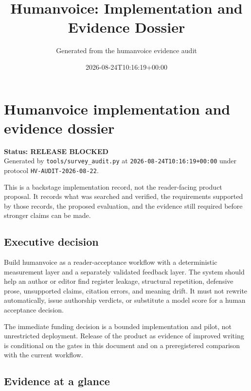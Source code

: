 \documentclass[11pt]{article}
\title{Humanvoice: Implementation and Evidence Dossier}
\author{Generated from the humanvoice evidence audit}
\date{2026-08-24T10:16:19+00:00}
\begin{document}
\hypertarget{humanvoice-implementation-and-evidence-dossier}{%
\section{Humanvoice implementation and evidence dossier}\label{humanvoice-implementation-and-evidence-dossier}}

\textbf{Status: RELEASE BLOCKED}\\
Generated by \texttt{tools/survey\_audit.py} at \texttt{2026-08-24T10:16:19+00:00} under protocol \texttt{HV-AUDIT-2026-08-22}.

This is a backstage implementation record, not the reader-facing product proposal. It records what was searched and verified, the requirements supported by those records, the proposed evaluation, and the evidence still required before stronger claims can be made.

\hypertarget{executive-decision}{%
\subsection{Executive decision}\label{executive-decision}}

Build humanvoice as a reader-acceptance workflow with a deterministic measurement layer and a separately validated feedback layer. The system should help an author or editor find register leakage, structural repetition, defensive prose, unsupported claims, citation errors, and meaning drift. It must not rewrite automatically, issue authorship verdicts, or substitute a model score for a human acceptance decision.

The immediate funding decision is a bounded implementation and pilot, not unrestricted deployment. Release of the product as evidence of improved writing is conditional on the gates in this document and on a preregistered comparison with the current workflow.

\hypertarget{evidence-at-a-glance}{%
\subsection{Evidence at a glance}\label{evidence-at-a-glance}}
\end{document}
